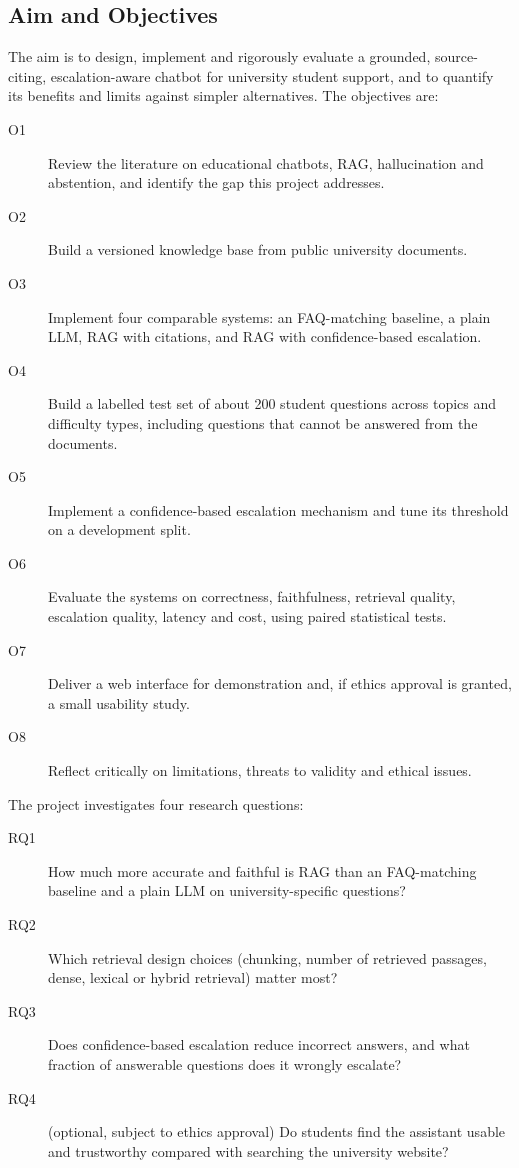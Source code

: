 \subsection{Aim and Objectives} \label{sec:intro_aim}

The aim is to design, implement and rigorously evaluate a grounded, source-citing, escalation-aware chatbot for university student support, and to quantify its benefits and limits against simpler alternatives. The objectives are:

\begin{description}
  \item[O1] Review the literature on educational chatbots, RAG, hallucination and abstention, and identify the gap this project addresses.
  \item[O2] Build a versioned knowledge base from public university documents.
  \item[O3] Implement four comparable systems: an FAQ-matching baseline, a plain LLM, RAG with citations, and RAG with confidence-based escalation.
  \item[O4] Build a labelled test set of about 200 student questions across topics and difficulty types, including questions that cannot be answered from the documents.
  \item[O5] Implement a confidence-based escalation mechanism and tune its threshold on a development split.
  \item[O6] Evaluate the systems on correctness, faithfulness, retrieval quality, escalation quality, latency and cost, using paired statistical tests.
  \item[O7] Deliver a web interface for demonstration and, if ethics approval is granted, a small usability study.
  \item[O8] Reflect critically on limitations, threats to validity and ethical issues.
\end{description}

The project investigates four research questions:

\begin{description}
  \item[RQ1] How much more accurate and faithful is RAG than an FAQ-matching baseline and a plain LLM on university-specific questions?
  \item[RQ2] Which retrieval design choices (chunking, number of retrieved passages, dense, lexical or hybrid retrieval) matter most?
  \item[RQ3] Does confidence-based escalation reduce incorrect answers, and what fraction of answerable questions does it wrongly escalate?
  \item[RQ4] (optional, subject to ethics approval) Do students find the assistant usable and trustworthy compared with searching the university website?
\end{description}

